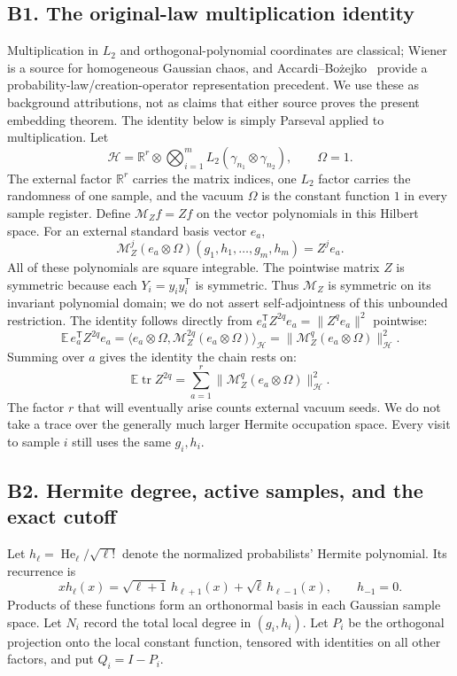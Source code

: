 \documentclass[11pt]{article}
\numberwithin{equation}{section}
\theoremstyle{definition}\newtheorem{definition}[theorem]{Definition}
\theoremstyle{remark}\newtheorem{remark}[theorem]{Remark}
\newcommand{\R}{\mathbb R}\newcommand{\E}{\mathbb E}\newcommand{\Prob}{\mathbb P}
\newcommand{\tr}{\operatorname{tr}}\newcommand{\Ent}{\operatorname{Ent}}
\newcommand{\norm}[1]{\lVert#1\rVert}\newcommand{\ip}[2]{\langle#1,#2\rangle}
\begin{document}
\subsection{B1. The original-law multiplication identity}
Multiplication in $L_2$ and orthogonal-polynomial coordinates are classical;
Wiener~\cite{Wiener} is a source for homogeneous Gaussian chaos, and
Accardi--Bo\.{z}ejko~\cite{AccardiBozejko} provide a probability-law/creation-operator
representation precedent. We use these as background attributions, not as claims
that either source proves the present embedding theorem. The identity below is
simply Parseval applied to multiplication.
Let
\[
 \mathcal H=\R^r\otimes\bigotimes_{i=1}^m
 L_2(\gamma_{n_1}\otimes\gamma_{n_2}),\qquad \Omega=1.
\]
The external factor $\R^r$ carries the matrix indices, one $L_2$ factor carries
the randomness of one sample, and the vacuum $\Omega$ is the constant function
$1$ in every sample register.
Define $\mathcal M_Zf=Zf$ on the vector polynomials in this Hilbert space.
For an external standard basis vector $e_a$,
\[
 \mathcal M_Z^j(e_a\otimes\Omega)(g_1,h_1,\ldots,g_m,h_m)=Z^je_a.
\]
All of these polynomials are square integrable. The pointwise matrix $Z$ is
symmetric because each $Y_i=y_i y_i^{\mathsf T}$ is symmetric. Thus
$\mathcal M_Z$ is symmetric on its invariant polynomial domain; we do not
assert self-adjointness of this unbounded restriction. The identity follows
directly from $e_a^{\mathsf T}Z^{2q}e_a=\norm{Z^qe_a}^2$ pointwise:
\[
 \E\,e_a^{\mathsf T}Z^{2q}e_a
 =\ip{e_a\otimes\Omega}{\mathcal M_Z^{2q}(e_a\otimes\Omega)}_{\mathcal H}
 =\norm{\mathcal M_Z^q(e_a\otimes\Omega)}_{\mathcal H}^2.
\]
Summing over $a$ gives the identity the chain rests on:
\begin{equation}\label{eq:vacuum}
 \boxed{\E\tr Z^{2q}
 =\sum_{a=1}^r\norm{\mathcal M_Z^q(e_a\otimes\Omega)}_{\mathcal H}^2.}
\end{equation}
The factor $r$ that will eventually arise counts external vacuum seeds. We do not
take a trace over the generally much larger Hermite occupation space.
Every visit to sample $i$ still uses the same $g_i,h_i$.

\subsection{B2. Hermite degree, active samples, and the exact cutoff}
Let $h_\ell=\operatorname{He}_\ell/\sqrt{\ell!}$ denote the normalized probabilists'
Hermite polynomial. Its recurrence is
\begin{equation}\label{eq:Hermite}
 xh_\ell(x)=\sqrt{\ell+1}\,h_{\ell+1}(x)+\sqrt\ell\,h_{\ell-1}(x),
 \qquad h_{-1}=0.
\end{equation}
Products of these functions form an orthonormal basis in each Gaussian sample
space. Let $N_i$ record the total local degree in $(g_i,h_i)$.
Let $P_i$ be the orthogonal projection onto the local constant function, tensored
with identities on all other factors, and put $Q_i=I-P_i$.
\end{document}
